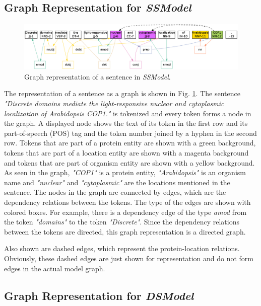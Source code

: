 \subsection{Graph Representation for \textit{SSModel}}\label{sec:graphSSModel}

\begin{figure}
\centering
\includegraphics[scale=0.3]{figures/SameSentenceGraph.png}
\caption{Graph representation of a sentence in \textit{SSModel}.}\label{fig:SSGraph}
\end{figure}

The representation of a sentence as a graph is shown in Fig. \ref{fig:SSGraph}. The sentence \textit{"Discrete domains mediate the light-responsive nuclear and cytoplasmic localization of Arabidopsis COP1."} is tokenized and every token forms a node in the graph. A displayed node shows the text of its token in the first row and its part-of-speech (POS) tag and the token number joined by a hyphen in the second row. Tokens that are part of a protein entity are shown with a green background, tokens that are part of a location entity are shown with a magenta background and tokens that are part of organism entity are shown with a yellow background. As seen in the graph, \textit{"COP1"} is a protein entity, \textit{"Arabidopsis"} is an organism name and \textit{"nuclear"} and \textit{"cytoplasmic"} are the locations mentioned in the sentence. The nodes in the graph are connected by edges, which are the dependency
 relations between the tokens. The type of the edges are shown with colored boxes. For example, there is a dependency edge of the type \textit{amod} from the token \textit{"domains"}  to  the token \textit{"Discrete"}. Since the dependency relations between the tokens are directed, this graph representation is a directed graph.

Also shown are dashed edges, which represent the protein-location relations. Obviously, these dashed edges are just shown for representation and do not form edges in the actual model graph.

\subsection{Graph Representation for \textit{DSModel}}\label{sec:graphDSModel}


